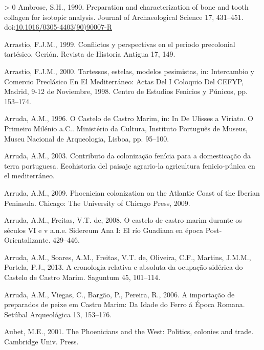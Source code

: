 \documentclass[3p]{elsarticle} %
\newlength{\cslhangindent}
\newenvironment{CSLReferences}[3] %
 {%
  \setlength{\parindent}{0pt}
  \ifodd #1 \everypar{\setlength{\hangindent}{\cslhangindent}}\ignorespaces\fi
  \ifnum #2 > 0
  \setlength{\parskip}{#2\baselineskip}
  \fi
 }%
 {}
\begin{document}
\hypertarget{refs}{}
\begin{CSLReferences}{1}{0}
\leavevmode\hypertarget{ref-ambrose90}{}%
Ambrose, S.H., 1990. Preparation and characterization of bone and tooth collagen for isotopic analysis. Journal of Archaeological Science 17, 431--451. doi:\href{https://doi.org/10.1016/0305-4403(90)90007-R}{10.1016/0305-4403(90)90007-R}

\leavevmode\hypertarget{ref-arrastio99}{}%
Arrastio, F.J.M., 1999. Conflictos y perspectivas en el periodo precolonial tartésico. Gerión. Revista de Historia Antigua 17, 149.

\leavevmode\hypertarget{ref-arrastio00}{}%
Arrastio, F.J.M., 2000. Tartessos, estelas, modelos pesimistas, in: Intercambio y Comercio Preclásico En El {Mediterráneo}: Actas Del {I} Coloquio Del {CEFYP}, {Madrid}, 9-12 de Noviembre, 1998. {Centro de Estudios Fenicios y Púnicos}, pp. 153--174.

\leavevmode\hypertarget{ref-arruda96}{}%
Arruda, A.M., 1996. O {Castelo} de {Castro Marim}, in: In {De Ulisses} a {Viriato}. {O} Primeiro Milénio a.{C}.. {Ministério da Cultura, Instituto Português de Museus, Museu Nacional de Arqueologia}, {Lisboa}, pp. 95--100.

\leavevmode\hypertarget{ref-arruda03}{}%
Arruda, A.M., 2003. Contributo da colonização fenícia para a domesticação da terra portuguesa. Ecohistoria del paisaje agrario-la agricultura fenicio-púnica en el mediterráneo.

\leavevmode\hypertarget{ref-arruda09}{}%
Arruda, A.M., 2009. Phoenician colonization on the {Atlantic Coast} of the {Iberian Peninsula}. {Chicago: The University of Chicago Press, 2009.}

\leavevmode\hypertarget{ref-arruda_freitas08}{}%
Arruda, A.M., Freitas, V.T. de, 2008. O castelo de castro marim durante os séculos VI e v a.n.e. Sidereum Ana I: El río Guadiana en época Post-Orientalizante. 429--446.

\leavevmode\hypertarget{ref-arruda_etal13}{}%
Arruda, A.M., Soares, A.M., Freitas, V.T. de, Oliveira, C.F., Martins, J.M.M., Portela, P.J., 2013. A cronologia relativa e absoluta da ocupação sidérica do {Castelo} de {Castro Marim}. Saguntum 45, 101--114.

\leavevmode\hypertarget{ref-arruda_etal06}{}%
Arruda, A.M., Viegas, C., Bargão, P., Pereira, R., 2006. A importação de preparados de peixe em {Castro Marim}: Da {Idade} do {Ferro} á {Época Romana}. Setúbal Arqueológica 13, 153--176.

\leavevmode\hypertarget{ref-aubet01}{}%
Aubet, M.E., 2001. The {Phoenicians} and the {West}: Politics, colonies and trade. {Cambridge Univ. Press}.


\end{CSLReferences}
\end{document}
